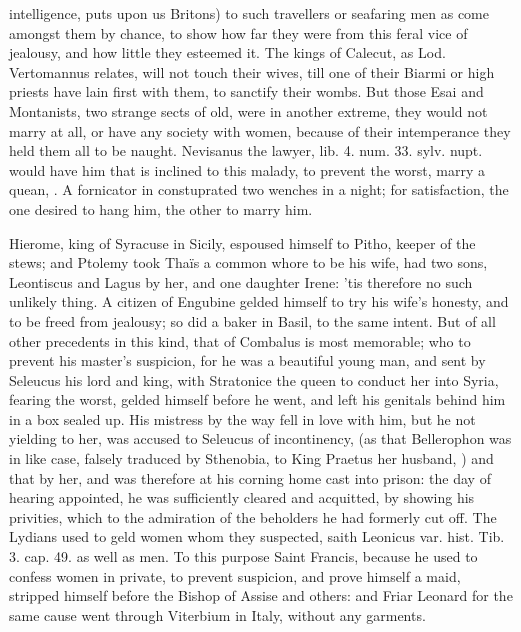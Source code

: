 intelligence, puts upon us Britons) to such travellers or seafaring men
as come amongst them by chance, to show how far they were from this
feral vice of jealousy, and how little they esteemed it. The kings of
Calecut, as Lod. Vertomannus relates, will not touch their wives,
till one of their Biarmi or high priests have lain first with them, to
sanctify their wombs. But those Esai and Montanists, two strange sects
of old, were in another extreme, they would not marry at all, or have
any society with women, because of their intemperance they held
them all to be naught. Nevisanus the lawyer, lib. 4. num. 33. sylv.
nupt. would have him that is inclined to this malady, to prevent the
worst, marry a quean, . A
fornicator in \Seneca constuprated two wenches in a night; for
satisfaction, the one desired to hang him, the other to marry him.

Hierome, king of Syracuse in Sicily, espoused himself to Pitho,
keeper of the stews; and Ptolemy took Thaïs a common whore to be his
wife, had two sons, Leontiscus and Lagus by her, and one daughter
Irene: 'tis therefore no such unlikely thing. A citizen of
Engubine gelded himself to try his wife's honesty, and to be freed from
jealousy; so did a baker in  Basil, to the same intent. But of
all other precedents in this kind, that of Combalus is most
memorable; who to prevent his master's suspicion, for he was a
beautiful young man, and sent by Seleucus his lord and king, with
Stratonice the queen to conduct her into Syria, fearing the worst,
gelded himself before he went, and left his genitals behind him in a
box sealed up. His mistress by the way fell in love with him, but he
not yielding to her, was accused to Seleucus of incontinency, (as that
Bellerophon was in like case, falsely traduced by Sthenobia, to King
Praetus her husband, ) and that by
her, and was therefore at his corning home cast into prison: the day of
hearing appointed, he was sufficiently cleared and acquitted, by
showing his privities, which to the admiration of the beholders he had
formerly cut off. The Lydians used to geld women whom they suspected,
saith Leonicus var. hist. Tib. 3. cap. 49. as well as men. To this
purpose Saint Francis, because he used to confess women in
private, to prevent suspicion, and prove himself a maid, stripped
himself before the Bishop of Assise and others: and Friar Leonard for
the same cause went through Viterbium in Italy, without any garments.

